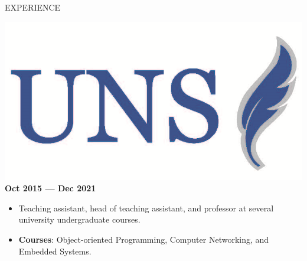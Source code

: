 \documentclass{resume} %
\begin{document}
\begin{rSection}{EXPERIENCE}





\includegraphics[height=3\fontcharht\font`\B]{uns_logo.png}%
 \hfill \textbf{Oct 2015 --- Dec 2021}\vspace{-0.2cm}
\begin{itemize}
    \item Teaching assistant, head of teaching assistant, and professor at several university undergraduate courses.
    \vspace{-0.25cm}
    \item \textbf{Courses}: Object-oriented Programming, Computer Networking, and Embedded Systems. 
\end{itemize}

\end{rSection} 
\end{document}
